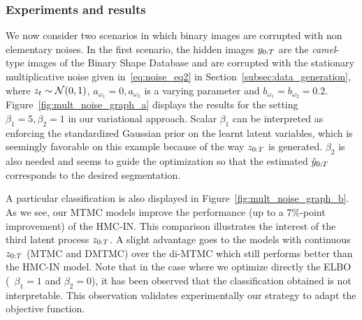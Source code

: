 \subsubsection{Experiments and results}
\label{sec:exp_res_tmc}
We now consider two scenarios
in which binary images are corrupted 
with non elementary noises. 
In the first scenario,
the hidden images $y_{0:T}$ are the \emph{camel}-type images of the Binary Shape Database and are corrupted
with the stationary multiplicative noise 
given in~\eqref{eq:noise_eq2} in Section~\ref{subsec:data_generation},
where $z_t\sim\mathcal{N}(0, 1)$, $a_{\omega_1}=0, a_{\omega_2}$ is a 
varying parameter and $b_{\omega_1}=b_{\omega_2}=0.2$.
Figure~\ref{fig:mult_noise_graph_a} displays
the results for the setting
$\beta_1=5,\beta_2=1$ in our variational approach. Scalar $\beta_1$ can be interpreted as enforcing the standardized Gaussian prior on the learnt latent variables, which is seemingly favorable on this example because of the way $z_{0:T}$ is generated. $\beta_2$ is also needed and seems to guide the optimization so that the estimated $\hat{{y}}_{0:T}$ corresponds to the desired segmentation. 

A particular classification 
is also displayed in Figure~\ref{fig:mult_noise_graph_b}.
As we see, our MTMC models improve the performance (up to a $7\%$-point
improvement) of the HMC-IN. This comparison illustrates the interest of the third
latent process $z_{0:T}$. A slight advantage goes to the models with continuous
$z_{0:T}$ (MTMC and DMTMC) over the di-MTMC which still performs better than the
HMC-IN model.
Note that in the case where we optimize directly the 
ELBO (\ie~$\beta_1=1$ and $\beta_2=0$), it 
has been observed that the classification
obtained is not interpretable. 
This observation validates
experimentally our strategy 
to adapt the objective function.
 
